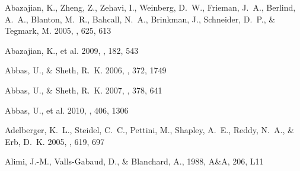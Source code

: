 \documentclass[]{emulateapj}
\begin{document}
\begin{thebibliography}{999}



Abazajian, K., Zheng, Z., Zehavi, I., Weinberg, D.\ W., Frieman, J.\ A., 
Berlind, A.\ A., Blanton, M.\ R., Bahcall, N.\ A., Brinkman, J., Schneider, 
D.\ P., \& Tegmark, M. 2005, 
\apj, 625, 613

Abazajian, K., et al. 2009, 
\apjs, 182, 543


Abbas, U., \& Sheth, R.\ K. 2006, \mnras, 372, 1749 

Abbas, U., \& Sheth, R.\ K. 2007, \mnras, 378, 641 

Abbas, U., et al. 2010, \mnras, 406, 1306 %


Adelberger, K.\ L., Steidel, C.\ C., Pettini, M., Shapley, A.\ E., Reddy,
N.\ A., \& Erb, D.\ K. 2005,
\apj, 619, 697

Alimi, J.-M., Valls-Gabaud, D., \& Blanchard, A., 1988, A\&A,
206, L11   


\end{thebibliography}
\end{document}
